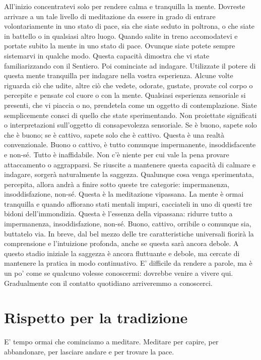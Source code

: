 All'inizio concentratevi solo per rendere calma e tranquilla la mente.
Dovreste arrivare a un tale livello di meditazione da essere in grado di
entrare volontariamente in uno stato di pace, sia che siate seduto in
poltrona, o che siate in battello o in qualsiasi altro luogo. Quando
salite in treno accomodatevi e portate subito la mente in uno stato di
pace. Ovunque siate potete sempre sistemarvi in qualche modo. Questa
capacità dimostra che vi state familiarizzando con il Sentiero. Poi
cominciate ad indagare. Utilizzate il potere di questa mente tranquilla
per indagare nella vostra esperienza. Alcune volte riguarda ciò che
udite, altre ciò che vedete, odorate, gustate, provate col corpo o
percepite e pensate col cuore o con la mente. Qualsiasi esperienza
sensoriale si presenti, che vi piaccia o no, prendetela come un oggetto
di contemplazione. Siate semplicemente consci di quello che state
sperimentando. Non proiettate significati o interpretazioni sull'oggetto
di consapevolezza sensoriale. Se è buono, sapete solo che è buono; se è
cattivo, sapete solo che è cattivo. Questa è una realtà convenzionale.
Buono o cattivo, è tutto comunque impermanente, insoddisfacente e
non-sé. Tutto è inaffidabile. Non c'è niente per cui vale la pena
provare attaccamento o aggrapparsi. Se riuscite a mantenere questa
capacità di calmare e indagare, sorgerà naturalmente la saggezza.
Qualunque cosa venga sperimentata, percepita, allora andrà a finire
sotto queste tre categorie: impermanenza, insoddisfazione, non-sé.
Questa è la meditazione vipassana. La mente è ormai tranquilla e quando
affiorano stati mentali impuri, cacciateli in uno di questi tre bidoni
dell'immondizia. Questa è l'essenza della vipassana: ridurre tutto a
impermanenza, insoddisfazione, non-sé. Buono, cattivo, orribile o
comunque sia, buttatelo via. In breve, dal bel mezzo delle tre
caratteristiche universali fiorirà la comprensione e l'intuizione
profonda, anche se questa sarà ancora debole. A questo stadio iniziale
la saggezza è ancora fluttuante e debole, ma cercate di mantenere la
pratica in modo continuativo. E' difficile da rendere a parole, ma è un
po' come se qualcuno volesse conoscermi: dovrebbe venire a vivere qui.
Gradualmente con il contatto quotidiano arriveremmo a
conoscerci.

\section{Rispetto per la tradizione}

E' tempo ormai che cominciamo a meditare. Meditare per capire, per
abbandonare, per lasciare andare e per trovare la pace.

